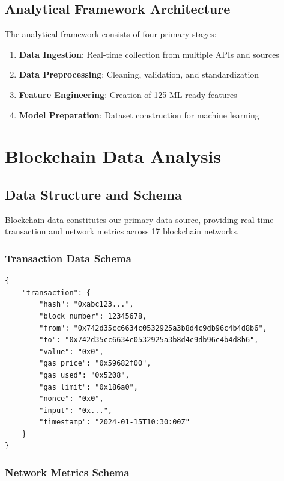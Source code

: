 \documentclass[12pt,a4paper]{article}
\begin{document}
\subsection{Analytical Framework Architecture}

The analytical framework consists of four primary stages:

\begin{enumerate}
    \item \textbf{Data Ingestion}: Real-time collection from multiple APIs and sources
    \item \textbf{Data Preprocessing}: Cleaning, validation, and standardization
    \item \textbf{Feature Engineering}: Creation of 125 ML-ready features
    \item \textbf{Model Preparation}: Dataset construction for machine learning
\end{enumerate}

\section{Blockchain Data Analysis}

\subsection{Data Structure and Schema}

Blockchain data constitutes our primary data source, providing real-time transaction and network metrics across 17 blockchain networks.

\subsubsection{Transaction Data Schema}

\begin{lstlisting}
{
    "transaction": {
        "hash": "0xabc123...",
        "block_number": 12345678,
        "from": "0x742d35cc6634c0532925a3b8d4c9db96c4b4d8b6",
        "to": "0x742d35cc6634c0532925a3b8d4c9db96c4b4d8b6",
        "value": "0x0",
        "gas_price": "0x59682f00",
        "gas_used": "0x5208",
        "gas_limit": "0x186a0",
        "nonce": "0x0",
        "input": "0x...",
        "timestamp": "2024-01-15T10:30:00Z"
    }
}
\end{lstlisting}

\subsubsection{Network Metrics Schema}
\end{document}
